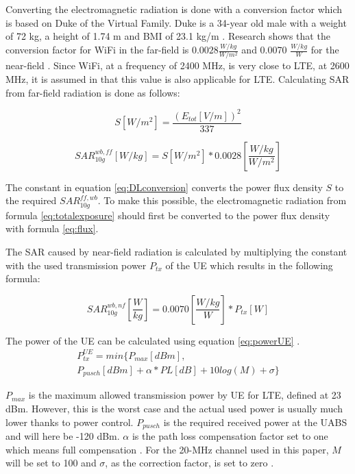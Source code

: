 \documentclass[twocolumn]{phdsymp} %
\begin{document}
Converting the electromagnetic radiation is done with a conversion factor which is based 
on Duke of the Virtual Family. Duke is a 34-year old male with a weight of 72 kg, a height of 1.74 m and BMI of 23.1 kg/m \cite{J22_plets2015joint}. 
Research shows that the conversion factor for WiFi in the far-field is $0.0028 \frac{W/kg}{W/m^2}$
and 0.0070 $\frac{W/kg}{W}$ for the near-field \cite{J22_plets2015joint}.
Since WiFi, at a frequency of 2400 MHz,
is very close to \gls{LTE}, at 2600 MHz, it is assumed in \cite{J22_plets2015joint} that this value is also applicable for \gls{LTE}.
Calculating \gls{SAR} from far-field radiation is done as follows:

\begin{equation}
S [W/m^2]= \frac{(E_{tot} [V/m])^2}{337}
\label{eq:flux}
\end{equation}

\begin{equation}
SAR^{wb,ff}_{10g} [W/kg]= S [W/m^2]* 0.0028 \left[\frac{W/kg}{W/m^2}\right]
\label{eq:DLconversion}
\end{equation}

The constant in equation \ref{eq:DLconversion} converts the \gls{power flux density} $S$ to the required $SAR^{ff,wb}_{10g}$.
To make this possible, the electromagnetic radiation
from formula \ref{eq:totalexposure} should first be converted to the  \gls{power flux density} with formula 
\ref{eq:flux}.

The SAR caused by near-field radiation is calculated by multiplying the constant with the used transmission
power $P_{tx}$ of the \gls{UE} which results in the following formula:

\begin{equation} 
SAR^{wb,nf}_{10g} \left[\frac{W}{kg}\right] = 0.0070 \left[\frac{W/kg}{W}\right] * P_{tx} [W]
\label{eq:ulToSar}
\end{equation}

The power of the \gls{UE} can be calculated using equation \ref{eq:powerUE} \cite{J22_plets2015joint}.
\begin{multline}
P_{tx}^{UE} = min \big\{P_{max} [dBm] , \\
 P_{pusch} [dBm] + \alpha * PL [dB] + 10log(M) + \sigma \big\}
 \label{eq:powerUE}
\end{multline}

$P_{max}$ is the maximum allowed transmission power by \gls{UE} for LTE, defined at 23 dBm. 
However, this is the worst case and the actual used power is usually much lower thanks to power control.
$P_{pusch}$ is the required received power at the
\gls{UABS} and will here be -120 dBm. 
$\alpha$ is the path loss compensation factor set to one which means full compensation \cite{J32,J33}.
For the 20-MHz channel used in this paper, $M$ will be set to 100 
and $\sigma$,  as the correction factor, is set to zero \cite{J22_plets2015joint,J32}.
\end{document}
